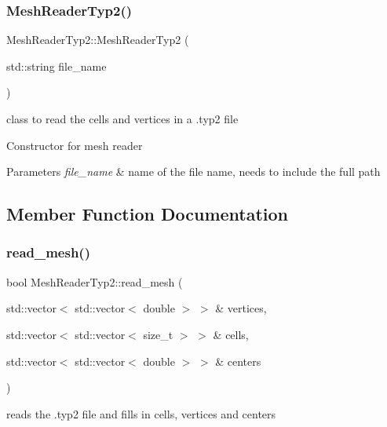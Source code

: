\subsubsection{\texorpdfstring{Mesh\+Reader\+Typ2()}{MeshReaderTyp2()}}
{\footnotesize\ttfamily Mesh\+Reader\+Typ2\+::\+Mesh\+Reader\+Typ2 (\begin{DoxyParamCaption}\item[{std\+::string}]{file\+\_\+name }\end{DoxyParamCaption})}



class to read the cells and vertices in a .typ2 file 

Constructor for mesh reader


\begin{DoxyParams}{Parameters}
{\em file\+\_\+name} & name of the file name, needs to include the full path \\
\hline
\end{DoxyParams}


\subsection{Member Function Documentation}
\mbox{\label{classHArDCore2D_1_1MeshReaderTyp2_a495a9de74127ecdf3c30c041863b9dd0}} 
\subsubsection{\texorpdfstring{read\+\_\+mesh()}{read\_mesh()}}
{\footnotesize\ttfamily bool Mesh\+Reader\+Typ2\+::read\+\_\+mesh (\begin{DoxyParamCaption}\item[{std\+::vector$<$ std\+::vector$<$ double $>$ $>$ \&}]{vertices,  }\item[{std\+::vector$<$ std\+::vector$<$ size\+\_\+t $>$ $>$ \&}]{cells,  }\item[{std\+::vector$<$ std\+::vector$<$ double $>$ $>$ \&}]{centers }\end{DoxyParamCaption})}



reads the .typ2 file and fills in cells, vertices and centers 

